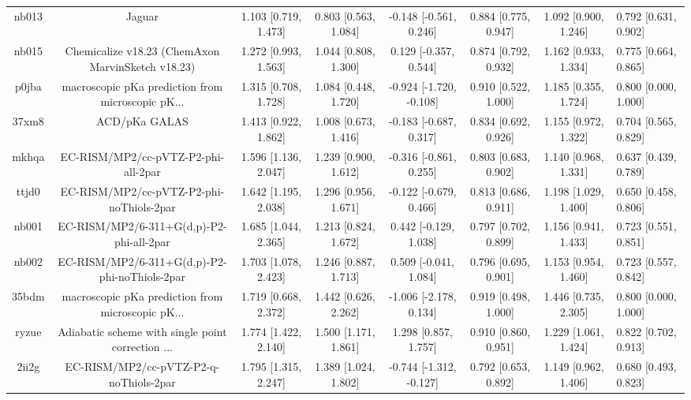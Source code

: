 \documentclass{article}
\begin{document}
\begin{center}
\begin{longtable}{|ccccccc|}
 nb013 &                                             Jaguar &  1.103 [0.719, 1.473] &  0.803 [0.563, 1.084] &   -0.148 [-0.561, 0.246] &  0.884 [0.775, 0.947] &   1.092 [0.900, 1.246] &   0.792 [0.631, 0.902] \\
 nb015 &  Chemicalize v18.23 (ChemAxon MarvinSketch v18.23) &  1.272 [0.993, 1.563] &  1.044 [0.808, 1.300] &    0.129 [-0.357, 0.544] &  0.874 [0.792, 0.932] &   1.162 [0.933, 1.334] &   0.775 [0.664, 0.865] \\
 p0jba &  macroscopic pKa prediction from microscopic pK... &  1.315 [0.708, 1.728] &  1.084 [0.448, 1.720] &  -0.924 [-1.720, -0.108] &  0.910 [0.522, 1.000] &   1.185 [0.355, 1.724] &   0.800 [0.000, 1.000] \\
 37xm8 &                                      ACD/pKa GALAS &  1.413 [0.922, 1.862] &  1.008 [0.673, 1.416] &   -0.183 [-0.687, 0.317] &  0.834 [0.692, 0.926] &   1.155 [0.972, 1.322] &   0.704 [0.565, 0.829] \\
 mkhqa &                EC-RISM/MP2/cc-pVTZ-P2-phi-all-2par &  1.596 [1.136, 2.047] &  1.239 [0.900, 1.612] &   -0.316 [-0.861, 0.255] &  0.803 [0.683, 0.902] &   1.140 [0.968, 1.331] &   0.637 [0.439, 0.789] \\
 ttjd0 &           EC-RISM/MP2/cc-pVTZ-P2-phi-noThiols-2par &  1.642 [1.195, 2.038] &  1.296 [0.956, 1.671] &   -0.122 [-0.679, 0.466] &  0.813 [0.686, 0.911] &   1.198 [1.029, 1.400] &   0.650 [0.458, 0.806] \\
 nb001 &           EC-RISM/MP2/6-311+G(d,p)-P2-phi-all-2par &  1.685 [1.044, 2.365] &  1.213 [0.824, 1.672] &    0.442 [-0.129, 1.038] &  0.797 [0.702, 0.899] &   1.156 [0.941, 1.433] &   0.723 [0.551, 0.851] \\
 nb002 &      EC-RISM/MP2/6-311+G(d,p)-P2-phi-noThiols-2par &  1.703 [1.078, 2.423] &  1.246 [0.887, 1.713] &    0.509 [-0.041, 1.084] &  0.796 [0.695, 0.901] &   1.153 [0.954, 1.460] &   0.723 [0.557, 0.842] \\
 35bdm &  macroscopic pKa prediction from microscopic pK... &  1.719 [0.668, 2.372] &  1.442 [0.626, 2.262] &   -1.006 [-2.178, 0.134] &  0.919 [0.498, 1.000] &   1.446 [0.735, 2.305] &   0.800 [0.000, 1.000] \\
 ryzue &  Adiabatic scheme with single point correction ... &  1.774 [1.422, 2.140] &  1.500 [1.171, 1.861] &     1.298 [0.857, 1.757] &  0.910 [0.860, 0.951] &   1.229 [1.061, 1.424] &   0.822 [0.702, 0.913] \\
 2ii2g &             EC-RISM/MP2/cc-pVTZ-P2-q-noThiols-2par &  1.795 [1.315, 2.247] &  1.389 [1.024, 1.802] &  -0.744 [-1.312, -0.127] &  0.792 [0.653, 0.892] &   1.149 [0.962, 1.406] &   0.680 [0.493, 0.823] \\

\end{longtable}
\end{center}
\end{document}
